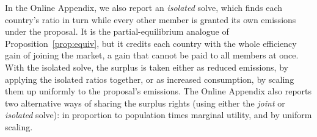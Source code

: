 \documentclass[12pt,english]{article}
\theoremstyle{remark}
\begin{document}
In the Online Appendix, we also report an \emph{isolated} solve, which finds each country's ratio in turn while every other member is granted its own emissions under the proposal. 
It is the partial-equilibrium analogue of Proposition~\ref{prop:equiv}, but it credits each country with the whole efficiency gain of joining the market, a gain that cannot be paid to all members at once. %
With the isolated solve, the surplus is taken either as reduced emissions, by applying the isolated ratios together, or as increased consumption, by scaling them up uniformly to the proposal's emissions. %
The Online Appendix also reports two alternative ways of sharing the surplus rights (using either the \textit{joint} or \textit{isolated} solve): in proportion to population times marginal utility, and by uniform scaling.
\end{document}
